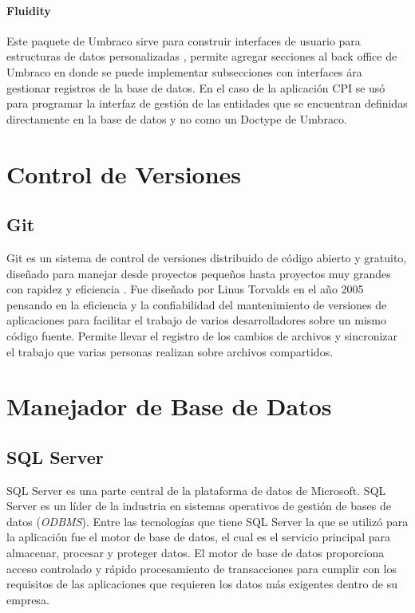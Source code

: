 \paragraph{Fluidity}
Este paquete de Umbraco sirve para construir interfaces de usuario para estructuras de datos personalizadas \cite{fluidity}, permite agregar secciones al back office de Umbraco en donde se puede implementar subsecciones con interfaces ára gestionar registros de la base de datos. En el caso de la aplicación CPI se usó para programar la interfaz de gestión de las entidades que se encuentran definidas directamente en la base de datos y no como un Doctype de Umbraco. 

\section{Control de Versiones}
\subsection{Git}
Git es un sistema de control de versiones distribuido de código abierto y gratuito, diseñado para manejar desde proyectos pequeños hasta proyectos muy grandes con rapidez y eficiencia \cite{git}. Fue diseñado por Linus Torvalds en el año 2005 pensando en la eficiencia y la confiabilidad del mantenimiento de versiones de aplicaciones para facilitar el trabajo de varios desarrolladores sobre un mismo código fuente. Permite llevar el registro de los cambios de archivos y sincronizar el trabajo que varias personas realizan sobre archivos compartidos.

\section{Manejador de Base de Datos}
\subsection{SQL Server}
SQL Server es una parte central de la plataforma de datos de Microsoft. SQL Server es un líder de la industria en sistemas operativos de gestión de bases de datos (\textit{ODBMS})\cite{sqlServerMicrosoft}. Entre las tecnologías que tiene SQL Server la que se utilizó para la aplicación fue el motor de base de datos, el cual es el servicio principal para almacenar, procesar y proteger datos. El motor de base de datos proporciona acceso controlado y rápido procesamiento de transacciones para cumplir con los requisitos de las aplicaciones que requieren los datos más exigentes dentro de su empresa. 

